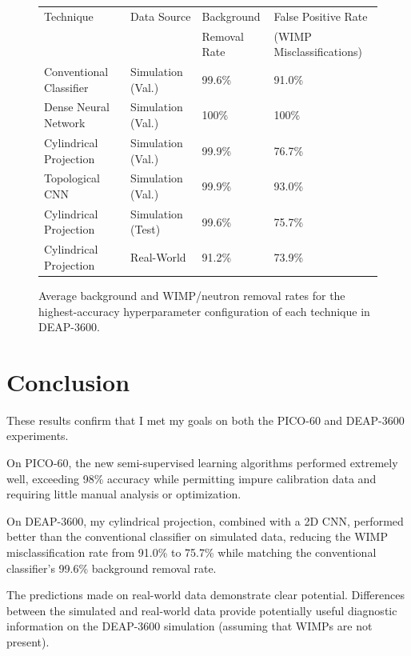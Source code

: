 \documentclass[12pt]{article}
\begin{document}
\begin{figure}[ht]
    \centering
    \begin{tabular}[b]{|l|l|l|l|}
        \hline
        \rowcolor{lightcyan}
        Technique & Data Source & Background & False Positive Rate \\
        \rowcolor{lightcyan}
        & & Removal Rate & (WIMP Misclassifications) \\
        \hline
        Conventional Classifier & Simulation (Val.) & 99.6\% & 91.0\% \\
        \hline
        Dense Neural Network & Simulation (Val.) & 100\% & 100\% \\
        \hline
        Cylindrical Projection & Simulation (Val.) & 99.9\% & 76.7\% \\
        \hline
        Topological CNN & Simulation (Val.) & 99.9\% & 93.0\% \\
        \hline
        Cylindrical Projection & Simulation (Test) & 99.6\% & 75.7\% \\
        \hline
        Cylindrical Projection & Real-World & 91.2\% & 73.9\% \\
        \hline
    \end{tabular}
    \caption{\label{deap_final_results} Average background and WIMP/neutron removal rates for the highest-accuracy hyperparameter configuration of each technique in DEAP-3600.}
\end{figure}

\section{Conclusion}

These results confirm that I met my goals on both the PICO-60 and DEAP-3600 experiments.

On PICO-60, the new semi-supervised learning algorithms performed extremely well, exceeding 98\% accuracy while permitting impure calibration data and requiring little manual analysis or optimization.

On DEAP-3600, my cylindrical projection, combined with a 2D CNN, performed better than the conventional classifier on simulated data, reducing the WIMP misclassification rate from 91.0\% to 75.7\% while matching the conventional classifier's 99.6\% background removal rate.

The predictions made on real-world data demonstrate clear potential. Differences between the simulated and real-world data provide potentially useful diagnostic information on the DEAP-3600 simulation (assuming that WIMPs are not present).
\end{document}
